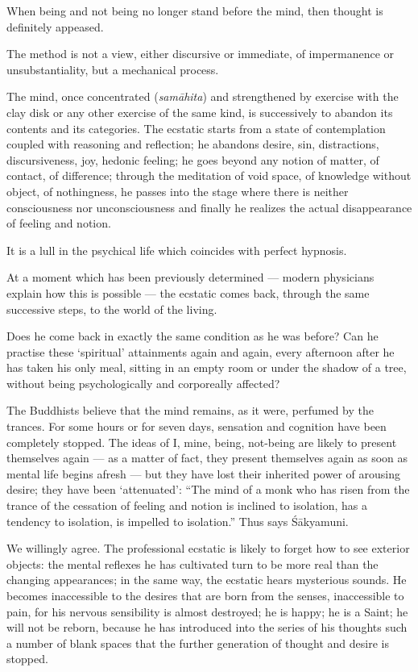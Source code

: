 \documentclass[a4paper, 11pt, oneside, english, landscape]{article}
\begin{document}
When being and not being no longer stand before the mind, then thought is definitely appeased.

The method is not a view, either discursive or immediate, of impermanence or unsubstantiality, but a mechanical process.

The mind, once concentrated (\emph{samāhita}) and strengthened by exercise with the clay disk or any other exercise of the same kind, is successively to abandon its contents and its categories. The ecstatic starts from a state of contemplation coupled with reasoning and reflection; he abandons desire, sin, distractions, discursiveness, joy, hedonic feeling; he goes beyond any notion of matter, of contact, of difference; through the meditation of void space, of knowledge without object, of nothingness, he passes into the stage where there is neither consciousness nor unconsciousness and finally he realizes the actual disappearance of feeling and notion.

It is a lull in the psychical life which coincides with perfect hypnosis.

At a moment which has been previously determined --- modern physicians explain how this is possible --- the ecstatic comes back, through the same successive steps, to the world of the living.

Does he come back in exactly the same condition as he was before? Can he practise these `spiritual' attainments again and again, every afternoon after he has taken his only meal, sitting in an empty room or under the shadow of a tree, without being psychologically and corporeally affected?

The Buddhists believe that the mind remains, as it were, perfumed by the trances. For some hours or for seven days, sensation and cognition have been completely stopped. The ideas of I, mine, being, not-being are likely to present themselves again --- as a matter of fact, they present themselves again as soon as mental life begins afresh --- but they have lost their inherited power of arousing desire; they have been `attenuated': ``The mind of a monk who has risen from the trance of the cessation of feeling and notion is inclined to isolation, has a tendency to isolation, is impelled to isolation.'' Thus says Śākyamuni.

We willingly agree. The professional ecstatic is likely to forget how to see exterior objects: the mental reflexes he has cultivated turn to be more real than the changing appearances; in the same way, the ecstatic hears mysterious sounds. He becomes inaccessible to the desires that are born from the senses, inaccessible to pain, for his nervous sensibility is almost destroyed; he is happy; he is a Saint; he will not be reborn, because he has introduced into the series of his thoughts such a number of blank spaces that the further generation of thought and desire is stopped.
\end{document}
